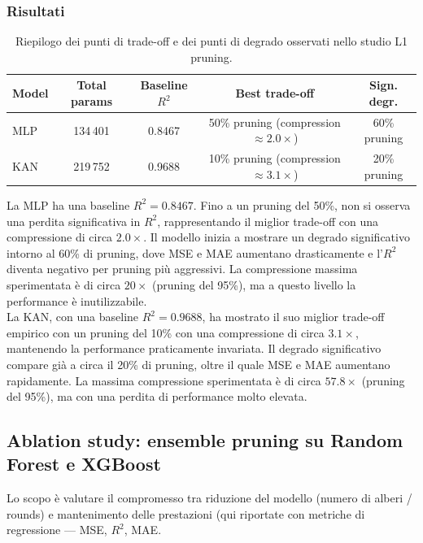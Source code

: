 \documentclass[a4paper,12pt]{report}
\begin{document}
	\subsubsection{Risultati}
	\begin{table}[H]
		\centering
		\setlength{\tabcolsep}{4pt}
		\begin{tabular}{lcccc}
			\toprule
			\textbf{Model} & \textbf{Total params} & \textbf{Baseline $R^2$} & \textbf{Best trade-off} & \textbf{Sign. degr.} \\
			\midrule
			MLP & 134\,401  & 0.8467 & 50\% pruning (compression $\approx 2.0\times$) & 60\% pruning \\
			KAN & 219\,752  & 0.9688 & 10\% pruning (compression $\approx 3.1\times$) & 20\% pruning \\
			\bottomrule
		\end{tabular}
		\caption{Riepilogo dei punti di trade-off e dei punti di degrado osservati nello studio L1 pruning.}
	\end{table}
	
	La MLP ha una baseline \(R^2=0.8467\). Fino a un pruning del 50\%, non si osserva una perdita significativa in \(R^2\), rappresentando il miglior trade-off con una compressione di circa $2.0\times$. Il modello inizia a mostrare un degrado significativo intorno al 60\% di pruning, dove MSE e MAE aumentano drasticamente e l'\(R^2\) diventa negativo per pruning più aggressivi. La compressione massima sperimentata è di circa $20\times$ (pruning del 95\%), ma a questo livello la performance è inutilizzabile. \\
	La KAN, con una baseline \(R^2=0.9688\), ha mostrato il suo miglior trade-off empirico con un pruning del 10\% con una compressione di circa $3.1\times$, mantenendo la performance praticamente invariata. Il degrado significativo compare già a circa il 20\% di pruning, oltre il quale MSE e MAE aumentano rapidamente. La massima compressione sperimentata è di circa $57.8\times$ (pruning del 95\%), ma con una perdita di performance molto elevata. \\
	
	\subsection{Ablation study: ensemble pruning su Random Forest e XGBoost}
	Lo scopo è valutare il compromesso tra riduzione del modello (numero di alberi / rounds) e mantenimento delle prestazioni (qui riportate con metriche di regressione — MSE, \(R^2\), MAE.
	
\end{document}
